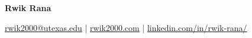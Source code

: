 \documentclass[10pt]{article}
\begin{document}
\pagestyle{empty}



\def\summ{1}

\begin{center}
    {\textbf{\Huge Rwik Rana}}
    \vspace{5pt}

     \href{mailto:rwik2000@utexas.edu}{rwik2000@utexas.edu} |
     \href{https://rwik2000.com}{rwik2000.com} | 
    \href{https://www.linkedin.com/in/rwik-rana/}{linkedin.com/in/rwik-rana/}
     \vspace{5pt}
\end{center}


% 


% 




% 


% 
\end{document}
